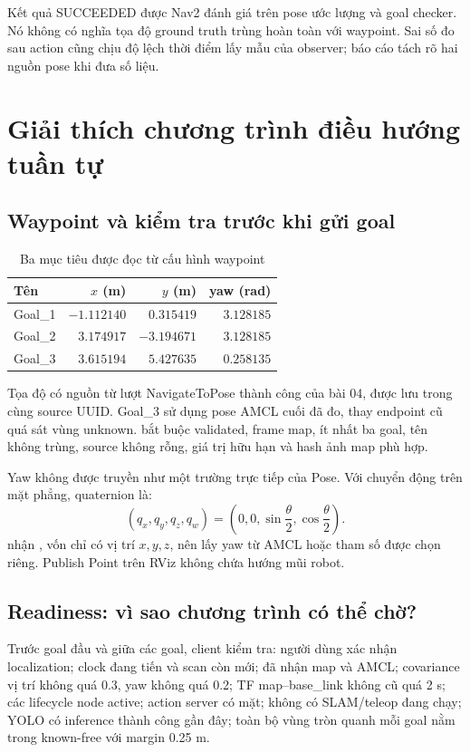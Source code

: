 Kết quả SUCCEEDED được Nav2 đánh giá trên pose ước lượng và goal checker. Nó không có nghĩa tọa độ ground truth trùng hoàn toàn với waypoint. Sai số đo sau action cũng chịu độ lệch thời điểm lấy mẫu của observer; báo cáo tách rõ hai nguồn pose khi đưa số liệu.
\clearpage

\section{Giải thích chương trình điều hướng tuần tự}
\subsection{Waypoint và kiểm tra trước khi gửi goal}
\begin{table}[H]\centering
\caption{Ba mục tiêu được đọc từ cấu hình waypoint}\label{tab:goals}
\begin{tabular}{@{}lrrr@{}}\toprule
Tên&$x$ (m)&$y$ (m)&yaw (rad)\\\midrule
Goal\_1&$-1.112140$&$0.315419$&$3.128185$\\
Goal\_2&$3.174917$&$-3.194671$&$3.128185$\\
Goal\_3&$3.615194$&$5.427635$&$0.258135$\\\bottomrule
\end{tabular}\end{table}
Tọa độ có nguồn từ lượt NavigateToPose thành công của bài 04, được lưu trong  cùng source UUID. Goal\_3 sử dụng pose AMCL cuối đã đo, thay endpoint cũ quá sát vùng unknown.  bắt buộc validated, frame map, ít nhất ba goal, tên không trùng, source không rỗng, giá trị hữu hạn và hash ảnh map phù hợp.

Yaw không được truyền như một trường trực tiếp của Pose. Với chuyển động trên mặt phẳng, quaternion là:
\begin{equation}
(q_x,q_y,q_z,q_w)=\left(0,0,\sin\frac{\theta}{2},\cos\frac{\theta}{2}\right).
\end{equation}
 nhận , vốn chỉ có vị trí $x,y,z$, nên lấy yaw từ AMCL hoặc tham số được chọn riêng. Publish Point trên RViz không chứa hướng mũi robot.

\subsection{Readiness: vì sao chương trình có thể chờ?}
Trước goal đầu và giữa các goal, client kiểm tra: người dùng xác nhận localization; clock đang tiến và scan còn mới; đã nhận map và AMCL; covariance vị trí không quá 0.3, yaw không quá 0.2; TF map--base\_link không cũ quá 2 s; các lifecycle node active; action server có mặt; không có SLAM/teleop đang chạy; YOLO có inference thành công gần đây; toàn bộ vùng tròn quanh mỗi goal nằm trong known-free với margin 0.25 m.

